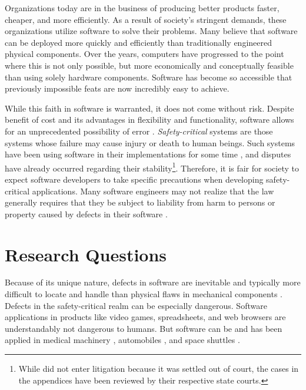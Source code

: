 \documentclass[12pt]{report}
\begin{document}
Organizations today are in the business of producing better products faster, cheaper, and more efficiently. As a result of society's stringent demands, these organizations utilize software to solve their problems. Many believe that software can be deployed more quickly and efficiently than traditionally engineered physical components. Over the years, computers have progressed to the point where this is not only possible, but more economically and conceptually feasible than using solely hardware components. Software has become so accessible that previously impossible feats are now incredibly easy to achieve. 

While this faith in software is warranted, it does not come without risk. Despite benefit of cost and its advantages in flexibility and functionality, software allows for an unprecedented possibility of error \cite{Brooks87}. \textit{Safety-critical} systems are those systems whose failure may cause injury or death to human beings. Such systems have been using software in their implementations for some time \cite{Therac25}, and disputes have already occurred regarding their stability\footnote{While \cite{Therac25} did not enter litigation because it was settled out of court, the cases in the appendices have been reviewed by their respective state courts.}. Therefore, it is fair for society to expect software developers to take specific precautions when developing safety-critical applications. Many software engineers may not realize that the law generally requires that they be subject to liability from harm to persons or property caused by defects in their software \cite{FAKE}.

\section{Research Questions} 

Because of its unique nature, defects in software are inevitable and typically more difficult to locate and handle than physical flaws in mechanical components \cite{Parnas90}. Defects in the safety-critical realm can be especially dangerous. Software applications in products like video games, spreadsheets, and web browsers are understandably not dangerous to humans. But software can be and has been applied in medical machinery \cite{FAKE}, automobiles \cite{FAKE}, and space shuttles \cite{FAKE}.
\end{document}
